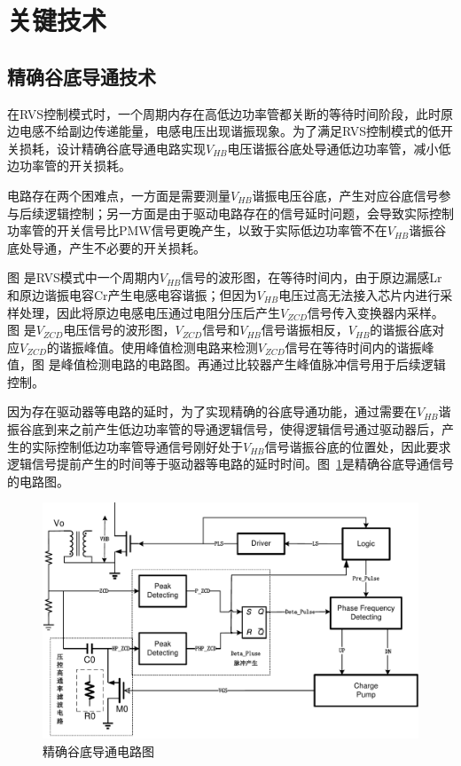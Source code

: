 \section{关键技术}
\subsection{精确谷底导通技术}
在RVS控制模式时，一个周期内存在高低边功率管都关断的等待时间阶段，此时原边电感不给副边传递能量，电感电压出现谐振现象。为了满足RVS控制模式的低开关损耗，设计精确谷底导通电路实现$V_{HB}$电压谐振谷底处导通低边功率管，减小低边功率管的开关损耗。

电路存在两个困难点，一方面是需要测量$V_{HB}$谐振电压谷底，产生对应谷底信号参与后续逻辑控制；另一方面是由于驱动电路存在的信号延时问题，会导致实际控制功率管的开关信号比PMW信号更晚产生，以致于实际低边功率管不在$V_{HB}$谐振谷底处导通，产生不必要的开关损耗。

图 是RVS模式中一个周期内$V_{HB}$信号的波形图，在等待时间内，由于原边漏感Lr和原边谐振电容Cr产生电感电容谐振；但因为$V_{HB}$电压过高无法接入芯片内进行采样处理，因此将原边电感电压通过电阻分压后产生$V_{ZCD}$信号传入变换器内采样。图 是$V_{ZCD}$电压信号的波形图，$V_{ZCD}$信号和$V_{HB}$信号谐振相反，$V_{HB}$的谐振谷底对应$V_{ZCD}$的谐振峰值。使用峰值检测电路来检测$V_{ZCD}$信号在等待时间内的谐振峰值，图 是峰值检测电路的电路图。再通过比较器产生峰值脉冲信号用于后续逻辑控制。

因为存在驱动器等电路的延时，为了实现精确的谷底导通功能，通过需要在$V_{HB}$谐振谷底到来之前产生低边功率管的导通逻辑信号，使得逻辑信号通过驱动器后，产生的实际控制低边功率管导通信号刚好处于$V_{HB}$信号谐振谷底的位置处，因此要求逻辑信号提前产生的时间等于驱动器等电路的延时时间。图~\ref{fig:精确谷底导通电路图1}是精确谷底导通信号的电路图。

\begin{figure}[htbp] 
    \centering
    \includegraphics[width=0.8\linewidth]{figures/精确谷底导通电路图1.pdf}
    \caption{精确谷底导通电路图}
    \label{fig:精确谷底导通电路图1}
\end{figure}

